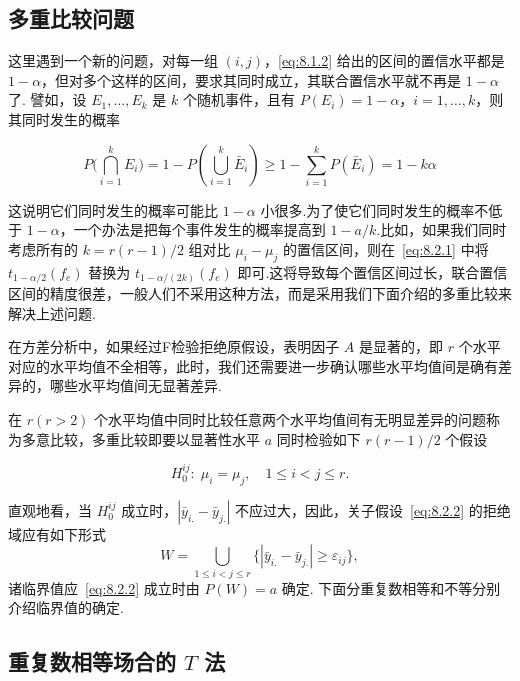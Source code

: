\subsection{多重比较问题}

这里遇到一个新的问题，对每一组 $(i, j)$，\eqref{eq:8.1.2} 给出的区间的置信水平都是 $1-\alpha$，但对多个这样的区间，要求其同时成立，其联合置信水平就不再是  $1-\alpha$ 了. 譬如，设 $E_1,\ldots, E_k$ 是 $k$ 个随机事件，且有 $P(E_i)=1-\alpha$，$i=1,\ldots, k$，则其同时发生的概率 

\begin{equation}
  P\big(\bigcap_{i=1}^{k} E_{i}\big)=1-P\left(\bigcup_{i=1}^{k} \bar{E}_{i}\right) \geqslant 1-\sum_{i=1}^{k} P\left(\bar{E}_{i}\right)=1-k \alpha
\end{equation}

这说明它们同时发生的概率可能比 $1-\alpha$ 小很多.为了使它们同时发生的概率不低于 $1-\alpha$，一个办法是把每个事件发生的概率提高到 $1-a/k$.比如，如果我们同时考虑所有的 $k = r(r-1)/2$ 组对比 $\mu_i - \mu_j$ 的置信区间，则在~\eqref{eq:8.2.1} 中将 $t_{1-\alpha/2}(f_e)$ 替换为 $t_{1-\alpha/(2k)}(f_e)$ 即可.这将导致每个置信区间过长，联合置信区间的精度很差，一般人们不采用这种方法，而是采用我们下面介绍的多重比较来解决上述问题.

在方差分析中，如果经过F检验拒绝原假设，表明因子 $A$ 是显著的，即 $r$ 个水平对应的水平均值不全相等，此时，我们还需要进一步确认哪些水平均值间是确有差异的，哪些水平均值间无显著差异. 

在 $r(r>2)$ 个水平均值中同时比较任意两个水平均值间有无明显差异的问题称为多意比较，多重比较即要以显著性水平 $a$ 同时检验如下 $r(r-1)/2$ 个假设

\begin{equation}\label{eq:8.2.2}
  H_{0}^{ij}:\; \mu_i = \mu_j,\quad 1 \leq i < j \leq r.
\end{equation}

直观地看，当 $H_{0}^{ij}$ 成立时，$|\bar{y}_{i.} - \bar{y}_{j.}|$ 不应过大，因此，关子假设~\eqref{eq:8.2.2} 的拒绝域应有如下形式
\begin{equation*}
  W = \bigcup_{1\leq i < j \leq r}\{|\bar{y}_{i.} - \bar{y}_{j.}| \geq \varepsilon_{ij}\},
\end{equation*}
诸临界值应~\eqref{eq:8.2.2} 成立时由 $P(W)=a$ 确定. 下面分重复数相等和不等分别介绍临界值的确定.

\subsection{重复数相等场合的 $T$ 法}

